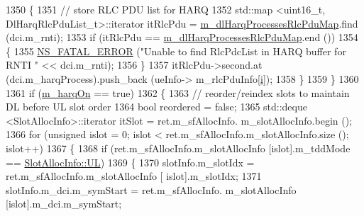 \begin{DoxyCode}
1350                                 \{
1351                                         \textcolor{comment}{// store RLC PDU list for HARQ}
1352                                         std::map <uint16\_t, DlHarqRlcPduList\_t>::iterator itRlcPdu =  
      \hyperlink{classns3_1_1MmWaveFlexTtiPfMacScheduler_a9a0027a79dee0a60f04e55c25efb7ab7}{m\_dlHarqProcessesRlcPduMap}.find (dci.m\_rnti);
1353                                         \textcolor{keywordflow}{if} (itRlcPdu == 
      \hyperlink{classns3_1_1MmWaveFlexTtiPfMacScheduler_a9a0027a79dee0a60f04e55c25efb7ab7}{m\_dlHarqProcessesRlcPduMap}.end ())
1354                                         \{
1355                                                 \hyperlink{group__fatal_ga5131d5e3f75d7d4cbfd706ac456fdc85}{NS\_FATAL\_ERROR} (\textcolor{stringliteral}{"Unable to find RlcPdcList in
       HARQ buffer for RNTI "} << dci.m\_rnti);
1356                                         \}
1357                                         itRlcPdu->second.at (dci.m\_harqProcess).push\_back (ueInfo->
      m\_rlcPduInfo[\hyperlink{bernuolliDistribution_8m_a6f6ccfcf58b31cb6412107d9d5281426}{i}]);
1358                                 \}
1359                         \}
1360 
1361                         \textcolor{keywordflow}{if} (\hyperlink{classns3_1_1MmWaveFlexTtiPfMacScheduler_ab7edfa7baaf0e2ce6c2ba43efc59e291}{m\_harqOn} == \textcolor{keyword}{true})
1362                         \{
1363                                 \textcolor{comment}{// reorder/reindex slots to maintain DL before UL slot order}
1364                                 \textcolor{keywordtype}{bool} reordered = \textcolor{keyword}{false};
1365                                 std::deque <SlotAllocInfo>::iterator itSlot = ret.m\_sfAllocInfo.
      m\_slotAllocInfo.begin ();
1366                                 \textcolor{keywordflow}{for} (\textcolor{keywordtype}{unsigned} islot = 0; islot < ret.m\_sfAllocInfo.m\_slotAllocInfo.size ();
       islot++)
1367                                 \{
1368                                         \textcolor{keywordflow}{if} (ret.m\_sfAllocInfo.m\_slotAllocInfo [islot].m\_tddMode == 
      \hyperlink{structns3_1_1SlotAllocInfo_a6cad60db1d39034f1851e2cea625fe5da916b5be54594ead6ed677c570311cad2}{SlotAllocInfo::UL})
1369                                         \{
1370                                                 slotInfo.m\_slotIdx = ret.m\_sfAllocInfo.m\_slotAllocInfo [
      islot].m\_slotIdx;
1371                                                 slotInfo.m\_dci.m\_symStart = ret.m\_sfAllocInfo.
      m\_slotAllocInfo [islot].m\_dci.m\_symStart;

\end{DoxyCode}

